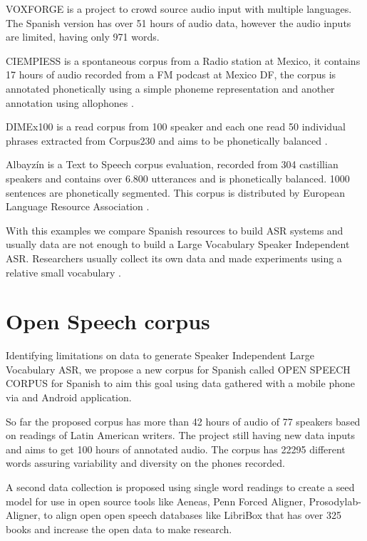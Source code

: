 VOXFORGE is a project to crowd source audio input with multiple languages. The Spanish version  has over 51 hours of audio data, however the audio inputs are limited, having only 971 words.

CIEMPIESS is a spontaneous corpus from a Radio station at Mexico, it contains 17 hours of audio recorded from a FM podcast at Mexico DF, the corpus is annotated phonetically using a simple phoneme representation and another annotation using allophones \cite{Hernandez-MenaCIEMPIESS:Corpus}.

DIMEx100 is a read corpus from 100 speaker and each one read 50 individual phrases extracted from Corpus230 \cite{Villasenor-Pineda2004ExperimentsWeb} and aims to be phonetically balanced \cite{Pineda2004DIMEx100:Spanish}.

Albayzín is a Text to Speech corpus evaluation, recorded from 304 castillian speakers and contains over 6.800 utterances and is phonetically balanced. 1000 sentences are phonetically segmented. This corpus is distributed by European Language Resource Association \cite{CampilloAlbayzinEvaluation}.

With this examples we compare Spanish resources to build ASR systems and usually data are not enough to build a Large Vocabulary Speaker Independent ASR. Researchers usually collect its own data and made experiments using a relative small vocabulary \cite{Becerra2017,Celis2017AcousticRegion}.
\section{Open Speech corpus}

Identifying limitations on data to generate Speaker Independent Large Vocabulary ASR, we propose a new corpus for Spanish called OPEN SPEECH CORPUS for Spanish to aim this goal using data gathered with a mobile phone via and Android application.

So far the proposed corpus has more than 42 hours of audio of 77 speakers based on readings of Latin American writers. The project still having new data inputs and aims to get 100 hours of annotated audio. The corpus has 22295 different words assuring variability and diversity on the phones recorded.

A second data collection is proposed using single word readings to create a seed model for use in open source tools like Aeneas, Penn Forced Aligner, Prosodylab-Aligner\cite{Gorman2011Prosodylab-aligner:Speech}, to align open open speech databases like LibriBox that has over 325 books and increase the open data to make research.